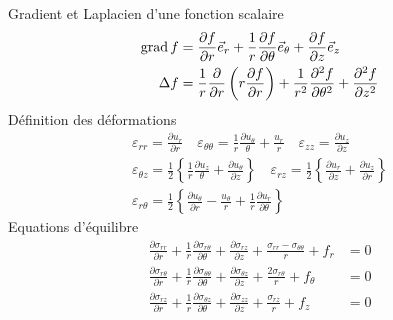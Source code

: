 Gradient et Laplacien d'une fonction scalaire
\begin{align*}
    \operatorname*{\mathrm{grad}} f &= \frac{\partial f}{\partial r} \vec{e}_r + \frac{1}{r} \frac{\partial f}{\partial \theta} \vec{e}_{\theta} + \frac{\partial f}{\partial z} \vec{e}_z \\
    \Delta f &= \frac{1}{r} \frac{\partial}{\partial r} \left( r \frac{\partial f}{\partial r} \right) + \frac{1}{r^{2}}\frac{\partial^2 f}{\partial \theta^2} + \frac{\partial^2 f}{\partial z^2}
\end{align*}
Définition des déformations
\begin{displaymath}
\begin{split}
    \varepsilon_{rr} = \frac{\partial u_r}{\partial r} \quad \varepsilon_{\theta\theta} = \frac{1}{r} \frac{\partial u_{\theta}}{\theta} + \frac{u_r}{r} \quad \varepsilon_{zz} = \frac{\partial u_z}{\partial z} \\
    \varepsilon_{\theta z} = \frac{1}{2} \left\{ \frac{1}{r} \frac{\partial u_z}{\theta} + \frac{\partial u_{\theta}}{\partial z} \right\} \quad \varepsilon_{rz} = \frac{1}{2} \left\{ \frac{\partial u_r}{\partial z} + \frac{\partial u_z}{\partial r} \right\} \\
    \varepsilon_{r\theta} = \frac{1}{2} \left\{ \frac{\partial u_{\theta}}{\partial r} - \frac{u_{\theta}}{r} + \frac{1}{r} \frac{\partial u_r}{\partial \theta} \right\}
\end{split}
\end{displaymath}
Equations d'équilibre
\begin{align*}
    \frac{\partial \sigma_{rr}}{\partial r} + \frac{1}{r} \frac{\partial \sigma_{r\theta}}{\partial \theta} + \frac{\partial \sigma_{rz}}{\partial z} + \frac{\sigma_{rr} - \sigma_{\theta\theta}}{r} + f_r &=0\\
    \frac{\partial \sigma_{r\theta}}{\partial r} + \frac{1}{r} \frac{\partial \sigma_{\theta\theta}}{\partial \theta} + \frac{\partial \sigma_{\theta z}}{\partial z} + \frac{2\sigma_{r\theta}}{r} + f_{\theta} &=0\\
    \frac{\partial \sigma_{rz}}{\partial r} + \frac{1}{r} \frac{\partial \sigma_{\theta z}}{\partial \theta} + \frac{\partial \sigma_{zz}}{\partial z} + \frac{\sigma_{rz}}{r} + f_z &=0
\end{align*}

